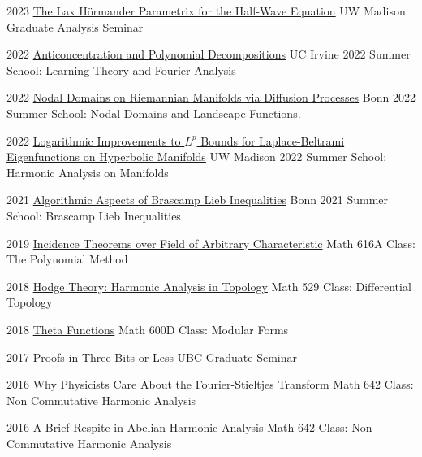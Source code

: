 \documentclass[a4paper]{cv-friggeri}
\begin{document}
\begin{entrylist}

\entry
{2023}
{\href{https://github.com/jdjake/Notes/raw/master/Talks/TalkNotes/LaxParametrix.pdf}{The Lax H\"{o}rmander Parametrix for the Half-Wave Equation}}
{}
{UW Madison Graduate Analysis Seminar}

\entry
{2022}
{\href{https://github.com/jdjake/Notes/raw/master/Talks/TalkNotes/AnticoncentrationPolynomialDecompositions.pdf}{Anticoncentration and Polynomial Decompositions}}
{}
{UC Irvine 2022 Summer School: Learning Theory and Fourier Analysis}

\entry
{2022}
{\href{https://github.com/jdjake/Notes/raw/master/Talks/TalkNotes/NodalGeometryAndBrownianMotion.pdf}{Nodal Domains on Riemannian Manifolds via Diffusion Processes}}
{}
{Bonn 2022 Summer School: Nodal Domains and Landscape Functions.}

\entry
{2022}
{\href{https://github.com/jdjake/Notes/raw/master/Talks/TalkNotes/LogarithmicImprovementsSpectralBands.pdf}{Logarithmic Improvements to $L^p$ Bounds for Laplace-Beltrami Eigenfunctions on Hyperbolic Manifolds}}
{}
{UW Madison 2022 Summer School: Harmonic Analysis on Manifolds}

\entry
{2021}
{\href{https://github.com/jdjake/Notes/raw/master/Talks/TalkNotes/RankDecreasingAndCapacity.pdf}{Algorithmic Aspects of Brascamp Lieb Inequalities}}
{}
{Bonn 2021 Summer School: Brascamp Lieb Inequalities}

\entry
{2019}
{\href{https://github.com/jdjake/Notes/raw/master/Talks/TalkNotes/SzemerediTrotterin3D.pdf}{Incidence Theorems over Field of Arbitrary Characteristic}}
{}
{Math 616A Class: The Polynomial Method}

\entry
{2018}
{\href{https://github.com/jdjake/Notes/raw/master/Talks/TalkNotes/HodgeTheory.pdf}{Hodge Theory: Harmonic Analysis in Topology}}
{}
{Math 529 Class: Differential Topology}

\entry
{2018}
{\href{https://github.com/jdjake/Notes/raw/master/Talks/TalkNotes/ThetaFunctions.pdf}{Theta Functions}}
{}
{Math 600D Class: Modular Forms}


\entry
{2017}
{\href{https://github.com/jdjake/Notes/raw/master/Talks/TalkNotes/ProofsInThreeBits.pdf}{Proofs in Three Bits or Less}}
{}
{UBC Graduate Seminar}

\entry
{2016}
{\href{https://github.com/jdjake/Notes/raw/master/Talks/TalkNotes/FourierStieltjes.pdf}{Why Physicists Care About the Fourier-Stieltjes Transform}}
{}
{Math 642 Class: Non Commutative Harmonic Analysis}

\entry
{2016}
{\href{https://github.com/jdjake/Notes/raw/master/Talks/TalkNotes/PontrayaginDuality.pdf}{A Brief Respite in Abelian Harmonic Analysis}}
{}
{Math 642 Class: Non Commutative Harmonic Analysis}

\end{entrylist}
\end{document}

